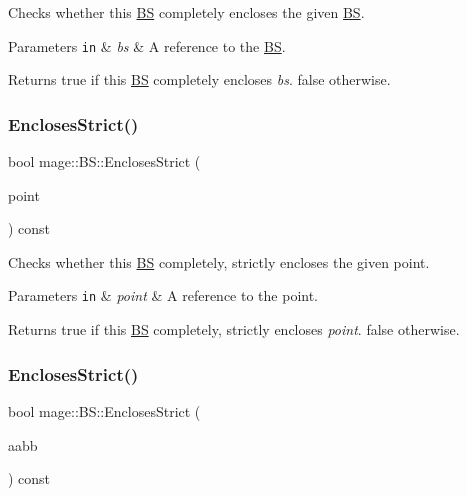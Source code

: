 Checks whether this \hyperlink{structmage_1_1_b_s}{BS} completely encloses the given \hyperlink{structmage_1_1_b_s}{BS}.


\begin{DoxyParams}[1]{Parameters}
\mbox{\tt in}  & {\em bs} & A reference to the \hyperlink{structmage_1_1_b_s}{BS}. \\
\hline
\end{DoxyParams}
\begin{DoxyReturn}{Returns}
{\ttfamily true} if this \hyperlink{structmage_1_1_b_s}{BS} completely encloses {\itshape bs}. {\ttfamily false} otherwise. 
\end{DoxyReturn}
\hypertarget{structmage_1_1_b_s_ad08a02ebf76d2b3a5903c9c69a0e80e1}{}\label{structmage_1_1_b_s_ad08a02ebf76d2b3a5903c9c69a0e80e1} 
\subsubsection{\texorpdfstring{Encloses\+Strict()}{EnclosesStrict()}\hspace{0.1cm}{\footnotesize\ttfamily [1/3]}}
{\footnotesize\ttfamily bool mage\+::\+B\+S\+::\+Encloses\+Strict (\begin{DoxyParamCaption}\item[{const \hyperlink{structmage_1_1_point3}{Point3} \&}]{point }\end{DoxyParamCaption}) const}

Checks whether this \hyperlink{structmage_1_1_b_s}{BS} completely, strictly encloses the given point.


\begin{DoxyParams}[1]{Parameters}
\mbox{\tt in}  & {\em point} & A reference to the point. \\
\hline
\end{DoxyParams}
\begin{DoxyReturn}{Returns}
{\ttfamily true} if this \hyperlink{structmage_1_1_b_s}{BS} completely, strictly encloses {\itshape point}. {\ttfamily false} otherwise. 
\end{DoxyReturn}
\hypertarget{structmage_1_1_b_s_a2114f30ef1fd41b0fdeab31c24a66b7a}{}\label{structmage_1_1_b_s_a2114f30ef1fd41b0fdeab31c24a66b7a} 
\subsubsection{\texorpdfstring{Encloses\+Strict()}{EnclosesStrict()}\hspace{0.1cm}{\footnotesize\ttfamily [2/3]}}
{\footnotesize\ttfamily bool mage\+::\+B\+S\+::\+Encloses\+Strict (\begin{DoxyParamCaption}\item[{const \hyperlink{structmage_1_1_a_a_b_b}{A\+A\+BB} \&}]{aabb }\end{DoxyParamCaption}) const}

